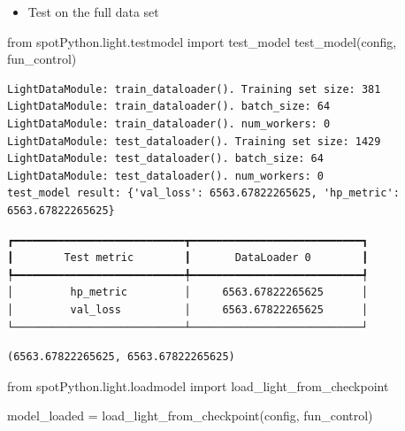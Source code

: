 \documentclass[
  letterpaper,
  DIV=11,
  numbers=noendperiod]{scrreprt}
\newenvironment{Shaded}{\begin{snugshade}}{\end{snugshade}}
\newcommand{\ImportTok}[1]{\textcolor[rgb]{0.00,0.46,0.62}{#1}}
\newcommand{\NormalTok}[1]{\textcolor[rgb]{0.00,0.23,0.31}{#1}}
\newcommand{\OperatorTok}[1]{\textcolor[rgb]{0.37,0.37,0.37}{#1}}
\providecommand{\tightlist}{%
  \setlength{\itemsep}{0pt}\setlength{\parskip}{0pt}}\usepackage{longtable,booktabs,array}
\begin{document}
\begin{itemize}
\tightlist
\item
  Test on the full data set
\end{itemize}

\begin{Shaded}
\begin{Highlighting}[]
\ImportTok{from}\NormalTok{ spotPython.light.testmodel }\ImportTok{import}\NormalTok{ test\_model}
\NormalTok{test\_model(config, fun\_control)}
\end{Highlighting}
\end{Shaded}

\begin{verbatim}
LightDataModule: train_dataloader(). Training set size: 381
LightDataModule: train_dataloader(). batch_size: 64
LightDataModule: train_dataloader(). num_workers: 0
LightDataModule: test_dataloader(). Training set size: 1429
LightDataModule: test_dataloader(). batch_size: 64
LightDataModule: test_dataloader(). num_workers: 0
test_model result: {'val_loss': 6563.67822265625, 'hp_metric': 6563.67822265625}
\end{verbatim}

\begin{verbatim}
┏━━━━━━━━━━━━━━━━━━━━━━━━━━━┳━━━━━━━━━━━━━━━━━━━━━━━━━━━┓
┃        Test metric        ┃       DataLoader 0        ┃
┡━━━━━━━━━━━━━━━━━━━━━━━━━━━╇━━━━━━━━━━━━━━━━━━━━━━━━━━━┩
│         hp_metric         │     6563.67822265625      │
│         val_loss          │     6563.67822265625      │
└───────────────────────────┴───────────────────────────┘
\end{verbatim}

\begin{verbatim}
(6563.67822265625, 6563.67822265625)
\end{verbatim}

\begin{Shaded}
\begin{Highlighting}[]
\ImportTok{from}\NormalTok{ spotPython.light.loadmodel }\ImportTok{import}\NormalTok{ load\_light\_from\_checkpoint}

\NormalTok{model\_loaded }\OperatorTok{=}\NormalTok{ load\_light\_from\_checkpoint(config, fun\_control)}
\end{Highlighting}
\end{Shaded}
\end{document}
